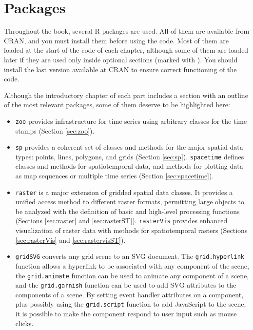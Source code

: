 \section{Packages}
\label{sec:introduction-packages}

Throughout the book, several \textsf{R} packages are used. All of them
are available from \textsf{CRAN}, and you must install them before
using the code. Most of them are loaded at the start of the code of
each chapter, although some of them are loaded later if they are used
only inside optional sections (marked with \floweroneleft). You should
install the last version available at \textsf{CRAN} to ensure correct
functioning of the code.

Although the introductory chapter of each part includes a section with
an outline of the most relevant packages, some of them deserve to be
highlighted here:

\begin{itemize}

\item \texttt{zoo} \cite{Zeileis.Grothendieck2005} provides
  infrastructure for time series using arbitrary classes for the time
  stamps (Section \ref{sec:zoo}).

\item \texttt{sp} \cite{Pebesma2012} provides a coherent set of
  classes and methods for the major spatial data types: points, lines,
  polygons, and grids (Section \ref{sec:sp}). \texttt{spacetime}
  \cite{Pebesma2012} defines classes and methods for spatiotemporal
  data, and methods for plotting data as map sequences or multiple
  time series (Section \ref{sec:spacetime}).

\item \texttt{raster} \cite{Hijmans2013} is a major extension of
  gridded spatial data classes. It provides a unified access method to
  different raster formats, permitting large objects to be analyzed
  with the definition of basic and high-level processing functions
  (Sections \ref{sec:raster} and \ref{sec:rasterST}). \texttt{rasterVis}
  \cite{Perpinan.Hijmans2013} provides enhanced visualization of
  raster data with methods for spatiotemporal rasters (Sections
  \ref{sec:rasterVis} and \ref{sec:rastervisST}).

\item \texttt{gridSVG} \cite{Murrell.Potter2013} converts any grid
  scene to an \textsf{SVG} document. The \lstinline{grid.hyperlink}
  function allows a hyperlink to be associated with any component of
  the scene, the \lstinline{grid.animate} function can be used to
  animate any component of a scene, and the \lstinline{grid.garnish}
  function can be used to add \textsf{SVG} attributes to the
  components of a scene. By setting event handler attributes on a
  component, plus possibly using the \lstinline{grid.script} function
  to add \textsf{JavaScript} to the scene, it is possible to make the
  component respond to user input such as mouse clicks.

\end{itemize}



